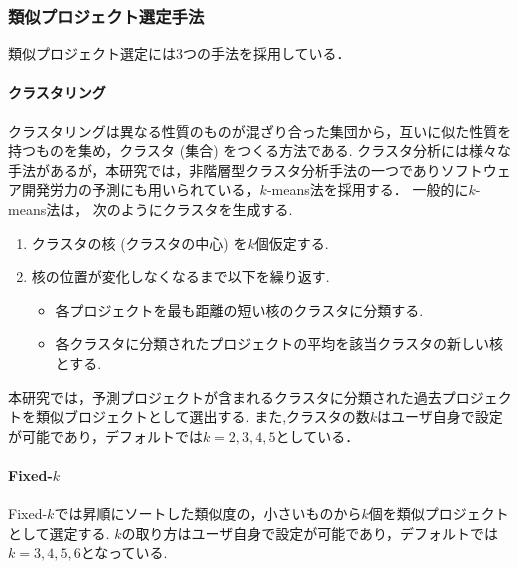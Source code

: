 \subsubsection{類似プロジェクト選定手法}\label{Selection}
類似プロジェクト選定には3つの手法を採用している．
\paragraph{クラスタリング \quad \\}
クラスタリング\cite{Hai2022}は異なる性質のものが混ざり合った集団から，互いに似た性質を持つものを集め，クラスタ (集合) をつくる方法である. クラスタ分析には様々な手法があるが，本研究では，非階層型クラスタ分析手法の一つでありソフトウェア開発労力の予測にも用いられている，$k$-means法を採用する．
一般的に$k$-means法は， 次のようにクラスタを生成する.
\begin{enumerate}
  \item クラスタの核 (クラスタの中心) を$k$個仮定する.
  \item 核の位置が変化しなくなるまで以下を繰り返す.
  \begin{itemize}
    \item 各プロジェクトを最も距離の短い核のクラスタに分類する.
    \item 各クラスタに分類されたプロジェクトの平均を該当クラスタの新しい核とする.
  \end{itemize}
\end{enumerate}
本研究では，予測プロジェクトが含まれるクラスタに分類された過去プロジェクトを類似ブロジェクトとして選出する.
また,クラスタの数$k$はユーザ自身で設定が可能であり，デフォルトでは$k=2,3,4,5$としている．
\paragraph{Fixed-$k$ \quad \\}
Fixed-$k$では昇順にソートした類似度の，小さいものから$k$個を類似プロジェクトとして選定する.
$k$の取り方はユーザ自身で設定が可能であり，デフォルトでは$k=3,4,5,6$となっている.

